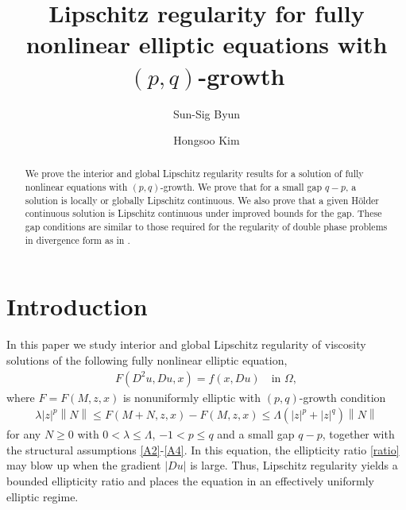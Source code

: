 \documentclass[reqno]{amsart}
\theoremstyle{plain}
\theoremstyle{definition}
\theoremstyle{remark}
\newcommand{\norm}[1]{\left\lVert#1\right\rVert}
\numberwithin{equation}{section}
\begin{document}
	
\title[ Lipschitz regularity for fully nonlinear elliptic equations with $(p,q)$-growth]{Lipschitz regularity for fully nonlinear elliptic equations with $(p,q)$-growth}

\author[Byun]{Sun-Sig Byun}
\address{Department of Mathematical Sciences and Research Institute of Mathematics,
	Seoul National University, Seoul 08826, Republic of Korea}

\author[Kim]{Hongsoo Kim}
\address{Department of Mathematical Sciences, Seoul National University, Seoul 08826, Republic of Korea}

\makeatletter
{}
\makeatother

\everymath{\displaystyle}

\begin{abstract}
	We prove the interior and global Lipschitz regularity results for a solution of fully nonlinear equations with $(p,q)$-growth.
    We prove that for a small gap $q-p$, a solution is locally or globally Lipschitz continuous.
    We also prove that a given H\"older continuous solution is Lipschitz continuous under improved bounds for the gap.
    These gap conditions are similar to those required for the regularity of double phase problems in divergence form as in \cite{Mingione152, Mingione18}.
\end{abstract}

\maketitle

\section{Introduction} \label{sec1}
In this paper we study interior and global Lipschitz regularity of viscosity solutions of the following fully nonlinear elliptic equation,
\begin{align} \label{PDE}
    F(D^2u, Du, x) = f(x,Du) \quad \text{in } \Omega,
\end{align}
where $F=F(M,z,x)$ is nonuniformly elliptic with $(p,q)$-growth condition
\begin{align} \label{pqgrowth}
    \lambda |z|^p \norm{N} \leq F(M+N,z,x)- F(M,z,x) \leq \Lambda(|z|^p+|z|^q)\norm{N}
\end{align}
for any $N\geq 0$ with $0<\lambda\leq \Lambda$, $-1<p\leq q$ and a small gap $q-p$, together with the structural assumptions \ref{A2}-\ref{A4}.
In this equation, the ellipticity ratio \eqref{ratio} may blow up when the gradient $|Du|$ is large. Thus, Lipschitz regularity yields a bounded ellipticity ratio and places the equation
in an effectively uniformly elliptic regime.
\end{document}
